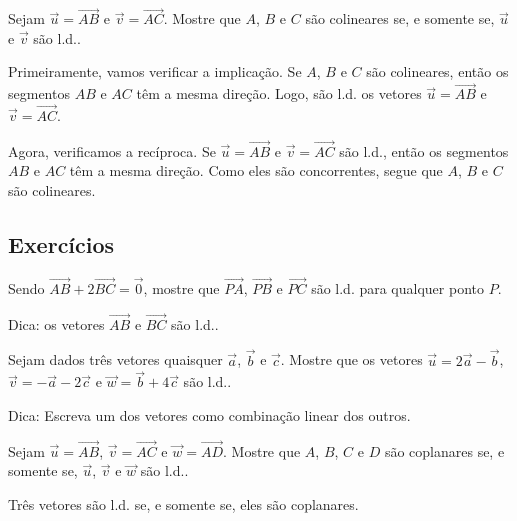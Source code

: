\begin{exeresol}
  Sejam $\vec{u} = \overrightarrow{AB}$ e $\vec{v} = \overrightarrow{AC}$. Mostre que $A$, $B$ e $C$ são colineares se, e somente se, $\vec{u}$ e $\vec{v}$ são l.d..
\end{exeresol}
\begin{resol}
  Primeiramente, vamos verificar a implicação. Se $A$, $B$ e $C$ são colineares, então os segmentos $AB$ e $AC$ têm a mesma direção. Logo, são l.d. os vetores $\vec{u} = \overrightarrow{AB}$ e $\vec{v} = \overrightarrow{AC}$.

  Agora, verificamos a recíproca. Se $\vec{u} = \overrightarrow{AB}$ e $\vec{v} = \overrightarrow{AC}$ são l.d., então os segmentos $AB$ e $AC$ têm a mesma direção. Como eles são concorrentes, segue que $A$, $B$ e $C$ são colineares.
\end{resol}

\subsection{Exercícios}

\begin{exer}
  Sendo $\overrightarrow{AB} + 2\overrightarrow{BC} = \vec{0}$, mostre que $\overrightarrow{PA}$, $\overrightarrow{PB}$ e $\overrightarrow{PC}$ são l.d. para qualquer ponto $P$.
\end{exer}
\begin{resp}
  Dica: os vetores $\overrightarrow{AB}$ e $\overrightarrow{BC}$ são l.d..
\end{resp}

\begin{exer}
  Sejam dados três vetores quaisquer $\vec{a}$, $\vec{b}$ e $\vec{c}$. Mostre que os vetores $\vec{u} = 2\vec{a}-\vec{b}$, $\vec{v}=-\vec{a}-2\vec{c}$ e $\vec{w}=\vec{b}+4\vec{c}$ são l.d..
\end{exer}
\begin{resp}
  Dica: Escreva um dos vetores como combinação linear dos outros.
\end{resp}

\begin{exer}
  Sejam $\vec{u} = \overrightarrow{AB}$, $\vec{v} = \overrightarrow{AC}$ e $\vec{w} = \overrightarrow{AD}$. Mostre que $A$, $B$, $C$ e $D$ são coplanares se, e somente se, $\vec{u}$, $\vec{v}$ e $\vec{w}$ são l.d..
\end{exer}
\begin{resp}
  Três vetores são l.d. se, e somente se, eles são coplanares.
\end{resp}

